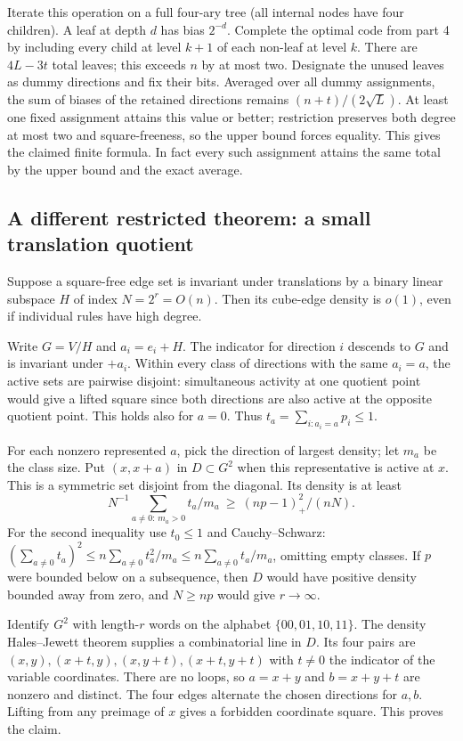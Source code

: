 \documentclass[
  10pt,
]{article}
\begin{document}
Iterate this operation on a full four-ary tree (all internal nodes have
four children). A leaf at depth \(d\) has bias \(2^{-d}\). Complete the
optimal code from part 4 by including every child at level \(k+1\) of
each non-leaf at level \(k\). There are \(4L-3t\) total leaves; this
exceeds \(n\) by at most two. Designate the unused leaves as dummy
directions and fix their bits. Averaged over all dummy assignments, the
sum of biases of the retained directions remains \((n+t)/(2\sqrt L)\).
At least one fixed assignment attains this value or better; restriction
preserves both degree at most two and square-freeness, so the upper
bound forces equality. This gives the claimed finite formula. In fact
every such assignment attains the same total by the upper bound and the
exact average.

\subsection{A different restricted theorem: a small translation
quotient}\label{a-different-restricted-theorem-a-small-translation-quotient}

Suppose a square-free edge set is invariant under translations by a
binary linear subspace \(H\) of index \(N=2^r=O(n)\). Then its cube-edge
density is \textbf{\(o(1)\)}, even if individual rules have high degree.

Write \(G=V/H\) and \(a_i=e_i+H\). The indicator for direction \(i\)
descends to \(G\) and is invariant under \(+a_i\). Within every class of
directions with the same \(a_i=a\), the active sets are pairwise
disjoint: simultaneous activity at one quotient point would give a
lifted square since both directions are also active at the opposite
quotient point. This holds also for \(a=0\). Thus
\(t_a=\sum_{i:a_i=a}p_i\le1\).

For each nonzero represented \(a\), pick the direction of largest
density; let \(m_a\) be the class size. Put \((x,x+a)\) in
\(D\subset G^2\) when this representative is active at \(x\). This is a
symmetric set disjoint from the diagonal. Its density is at least \[
N^{-1}\sum_{a\ne0:\,m_a>0}t_a/m_a\ \ge\ (np-1)_+^2/(nN).
\] For the second inequality use \(t_0\le1\) and Cauchy--Schwarz:
\((\sum_{a\ne0}t_a)^2\le n\sum_{a\ne0}t_a^2/m_a\le n\sum_{a\ne0} t_a/m_a\),
omitting empty classes. If \(p\) were bounded below on a subsequence,
then \(D\) would have positive density bounded away from zero, and
\(N\ge np\) would give \(r\to\infty\).

Identify \(G^2\) with length-\(r\) words on the alphabet
\(\{00,01,10,11\}\). The density Hales--Jewett theorem supplies a
combinatorial line in \(D\). Its four pairs are
\((x,y),(x+t,y),(x,y+t),(x+t,y+t)\) with \(t\ne0\) the indicator of the
variable coordinates. There are no loops, so \(a=x+y\) and \(b=x+y+t\)
are nonzero and distinct. The four edges alternate the chosen directions
for \(a,b\). Lifting from any preimage of \(x\) gives a forbidden
coordinate square. This proves the claim.
\end{document}

